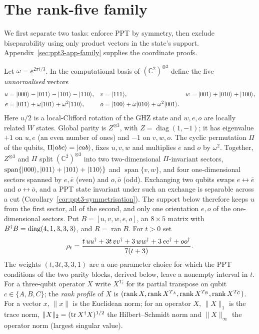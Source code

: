 \section{The rank-five family}\label{sec:ppt3-family}

We first separate two tasks: enforce PPT by symmetry, then exclude biseparability using only product vectors in the
state's support. Appendix~\ref{sec:ppt3-app-family} supplies the coordinate proofs.

Let $\omega=e^{2\pi i/3}$. In the computational basis of $(\mathbb C^2)^{\otimes3}$ define the five
\emph{unnormalised} vectors
\begin{align}
u&=\lvert000\rangle-\lvert011\rangle-\lvert101\rangle-\lvert110\rangle, & v&=\lvert111\rangle, & w&=\lvert001\rangle+\lvert010\rangle+\lvert100\rangle,\notag\\
e&=\lvert011\rangle+\omega\lvert101\rangle+\omega^2\lvert110\rangle, & o&=\lvert100\rangle+\omega\lvert010\rangle+\omega^2\lvert001\rangle. &&\label{eq:ppt3-vectors}
\end{align}
Here $u/2$ is a local-Clifford rotation of the GHZ state and $w,e,o$ are locally related $W$ states.
Global parity is $Z^{\otimes3}$, with $Z=\operatorname{diag}(1,-1)$; it has eigenvalue $+1$ on $u,e$ (an even number of
ones) and $-1$ on $v,w,o$. The cyclic permutation $\Pi$ of the qubits, $\Pi\lvert abc\rangle=\lvert cab\rangle$, fixes $u,v,w$ and
multiplies $e$ and $o$ by $\omega^2$. Together, $Z^{\otimes3}$ and $\Pi$ split $(\mathbb C^2)^{\otimes3}$ into two
two-dimensional $\Pi$-invariant sectors, $\operatorname{span}\{\lvert000\rangle,\lvert011\rangle+\lvert101\rangle+\lvert110\rangle\}$ and
$\operatorname{span}\{v,w\}$, and four one-dimensional sectors spanned by $e,\bar e$ (even) and $o,\bar o$ (odd).
Exchanging two qubits swaps $e\leftrightarrow\bar e$ and $o\leftrightarrow\bar o$, and a PPT state invariant under such an
exchange is separable across a cut (Corollary~\ref{cor:ppt3-symmetrisation}). The support below therefore keeps $u$ from
the first sector, all of the second, and only one orientation $e,o$ of the one-dimensional sectors.
Put $B=[u,v,w,e,o]$, an $8\times5$ matrix with $B^{\dagger} B=\operatorname{diag}(4,1,3,3,3)$, and $R=\operatorname{ran}B$.
For $t>0$ set
\begin{equation}\label{eq:ppt3-rho}
\rho_t=\frac{t\,uu^{\dagger}+3t\,vv^{\dagger}+3\,ww^{\dagger}+3\,ee^{\dagger}+oo^{\dagger}}{7(t+3)} .
\end{equation}
The weights $(t,3t,3,3,1)$ are a one-parameter choice for which the PPT conditions of the two parity blocks, derived below,
leave a nonempty interval in $t$.
For a three-qubit operator $X$ write $X^{T_c}$ for its partial transpose on qubit $c\in\{A,B,C\}$; the
\emph{rank profile} of $X$ is $(\operatorname{rank} X,\operatorname{rank} X^{T_A},\operatorname{rank} X^{T_B},\operatorname{rank} X^{T_C})$. For a vector $x$, $\|x\|$ is the
Euclidean norm; for an operator $X$, $\|X\|_1$ is the trace norm, $\|X\|_2=(\operatorname{tr} X^{\dagger} X)^{1/2}$ the Hilbert--Schmidt norm
and $\|X\|_\infty$ the operator norm (largest singular value).

